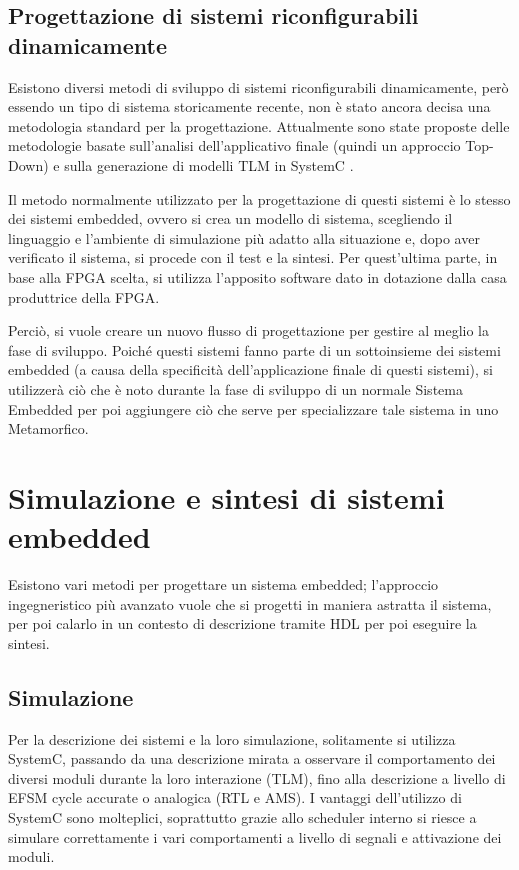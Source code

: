 \documentclass[a4paper,titlepage]{book}
\begin{document}
\subsection{Progettazione di sistemi riconfigurabili dinamicamente}

Esistono diversi metodi di sviluppo di sistemi riconfigurabili dinamicamente, però essendo un tipo di sistema storicamente recente, non è stato ancora decisa una metodologia standard per la progettazione. Attualmente sono state proposte delle metodologie basate sull'analisi dell'applicativo finale (quindi un approccio Top-Down) e sulla generazione di modelli TLM in SystemC \cite{ReconfigurMetod1} \cite{ReconfigurMetod2}.

Il metodo normalmente utilizzato per la progettazione di questi sistemi è lo stesso dei sistemi embedded, ovvero si crea un modello di sistema, scegliendo il linguaggio e l'ambiente di simulazione più adatto alla situazione e, dopo aver verificato il sistema, si procede con il test e la sintesi. Per quest'ultima parte, in base alla FPGA scelta, si utilizza l'apposito software dato in dotazione dalla casa produttrice della FPGA.

Perciò, si vuole creare un nuovo flusso di progettazione per gestire al meglio la fase di sviluppo. Poiché questi sistemi fanno parte di un sottoinsieme dei sistemi embedded (a causa della specificità dell'applicazione finale di questi sistemi), si utilizzerà ciò che è noto durante la fase di sviluppo di un normale Sistema Embedded per poi aggiungere ciò che serve per specializzare tale sistema in uno Metamorfico.

\section{Simulazione e sintesi di sistemi embedded}

Esistono vari metodi per progettare un sistema embedded; l'approccio ingegneristico più avanzato vuole che si progetti in maniera astratta il sistema, per poi calarlo in un contesto di descrizione tramite HDL per poi eseguire la sintesi.

\subsection{Simulazione}

Per la descrizione dei sistemi e la loro simulazione, solitamente si utilizza SystemC, passando da una descrizione mirata a osservare il comportamento dei diversi moduli durante la loro interazione (TLM), fino alla descrizione a livello di EFSM cycle accurate o analogica (RTL e AMS). I vantaggi dell'utilizzo di SystemC sono molteplici, soprattutto grazie allo scheduler interno si riesce a simulare correttamente i vari comportamenti a livello di segnali e attivazione dei moduli.
\end{document}
